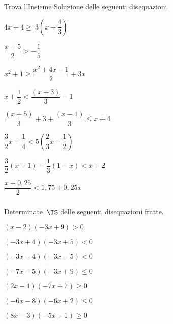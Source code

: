 \begin{esercizio}[\Ast]
 \label{ese:dis_14}
Trova l'Insieme Soluzione delle seguenti disequazioni.
 \begin{multicols}{2}
 \begin{enumeratea}
\item \(4x+4\ge~3\left(x+\dfrac{4}{3}\right)\)
\item \(\dfrac{x+5}{2}>-{\dfrac{1}{5}}\)
\item \(x^2+1\ge\dfrac{x^2+4x-1}{2}+3x\)
\item \(x+\dfrac{1}{2}<\dfrac{(x+3)}{3}-1\)
\item \(\dfrac{(x+5)}{3}+3+\dfrac{(x-1)}{3}\le x+4\)
\item \(\dfrac{3}{2}x+\dfrac{1}{4}<5\left(\dfrac{2}{3}x-\dfrac{1}{2}\right)\)
\item \(\dfrac{3}{2}(x+1)-\dfrac{1}{3}(1-x)<x+2\)
\item \(\dfrac{x+0,25}{2}<1,75+0,25x\)
\end{enumeratea}
\end{multicols}
\end{esercizio}

\subsubsection*{}


\begin{esercizio}[]
\label{ese:dis_}
Determinate~\(\IS\) delle seguenti disequazioni fratte.
\begin{multicols}{2}
\begin{enumeratea}
\spazielenx
\item \((x-2)(-3x+9)>0\)
\item \((-3x+4)(-3x+5)<0\)
\item \((-3x-4)(-3x-5)<0\)
\item \((-7x-5)(-3x+9)\le0\)
\item \((2x-1)(-7x+7)\ge0\)
\item \((-6x-8)(-6x+2)\le0\)
\item \((8x-3)(-5x+1)\ge0\)
\end{enumeratea}
\end{multicols}
\end{esercizio}

